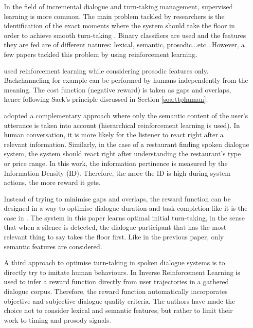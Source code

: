         In the field of incremental dialogue and turn-taking management, supervised learning is more common. The main problem tackled by researchers is the identification of the exact moments where the system should take the floor in order to achieve smooth turn-taking \cite{Raux2008,Meena2013}. Binary classifiers are used and the features they are fed are of different natures: lexical, semantic, prosodic...etc...However, a few papers tackled this problem by using reinforcement learning.
        
        \cite{Jonsdottir2008} used reinforcement learning while considering prosodic features only. Backchanneling for example can be performed by humans independently from the meaning. The cost function (negative reward) is taken as gaps and overlaps, hence following Sack's principle discussed in Section \ref{soa:ttphuman}.
        
        \cite{Dethlefs2012} adopted a complementary approach where only the semantic content of the user's utterance is taken into account (hierarchical reinforcement learning is used). In human conversation, it is more likely for the listener to react right after a relevant information. Similarly, in the case of a restaurant finding spoken dialogue system, the system should react right after understanding the restaurant's type or price range. In this work, the information pertinence is measured by the Information Density (ID). Therefore, the more the ID is high during system actions, the more reward it gets.
        
        Instead of trying to minimise gaps and overlaps, the reward function can be designed in a way to optimise dialogue duration and task completion like it is the case in \cite{Selfridge2010}. The system in this paper learns optimal initial turn-taking, in the sense that when a silence is detected, the dialogue participant that has the most relevant thing to say takes the floor first. Like in the previous paper, only semantic features are considered.
        
        A third approach to optimise turn-taking in spoken dialogue systems is to directly try to imitate human behaviours. In \cite{Kim2014} Inverse Reinforcement Learning is used to infer a reward function directly from user trajectories in a gathered dialogue corpus. Therefore, the reward function automatically incorporates objective and subjective dialogue quality criteria. The authors have made the choice not to consider lexical and semantic features, but rather to limit their work to timing and prosody signals.
    
